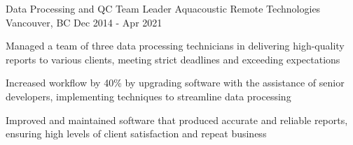 \begin{cventries}
  \cventry
    {Data Processing and QC Team Leader} %
    {Aquacoustic Remote Technologies} %
    {Vancouver, BC} %
    {Dec 2014 - Apr 2021} %
    {
      \begin{cvitems} %
        \item{Managed a team of three data processing technicians in delivering high-quality reports to various clients, meeting strict deadlines and exceeding expectations}
        \item{Increased workflow by 40\% by upgrading software with the assistance of senior developers, implementing techniques to streamline data processing}
        \item{Improved and maintained software that produced accurate and reliable reports, ensuring high levels of client satisfaction and repeat business}
      \end{cvitems}
    }

\end{cventries}

